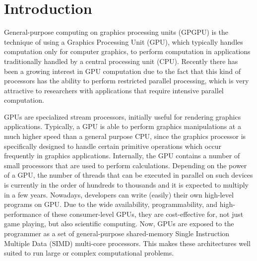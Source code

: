 \documentclass{comjnl}
\begin{document}

\maketitle

\section{Introduction}
\label{sec:intro}

General-purpose computing on graphics processing units (GPGPU) is the technique of using a Graphics Processing Unit (GPU), which typically handles computation only for computer graphics, to perform computation in applications traditionally handled by a central processing unit (CPU). Recently there has been a growing interest in GPU computation due to the fact that this kind of processors has the ability to perform restricted parallel processing, which is very attractive to researchers with applications that require intensive parallel computation.


GPUs are specialized stream processors, initially useful for rendering graphics applications. Typically, a GPU is able to perform graphics manipulations at a much higher speed than a general purpose CPU, since the graphics processor is specifically designed to handle certain primitive operations which occur frequently in graphics applications. Internally, the GPU contains a number of small processors that are used to perform calculations. 
Depending on the power of a GPU, the number of threads that can be executed in parallel on such devices is currently in the order of hundreds to thousands and it is expected to multiply in a few years. Nowadays, developers can write (easily) their own high-level programs on GPU. Due to the wide availability, programmability, and high-performance of these consumer-level GPUs, they are cost-effective for, not just game playing, but also scientific computing.
Now, GPUs are exposed to the programmer as a set of general-purpose shared-memory Single Instruction Multiple Data (SIMD) multi-core processors. 
This makes these architectures well suited to run large or complex computational problems. 
\end{document}
